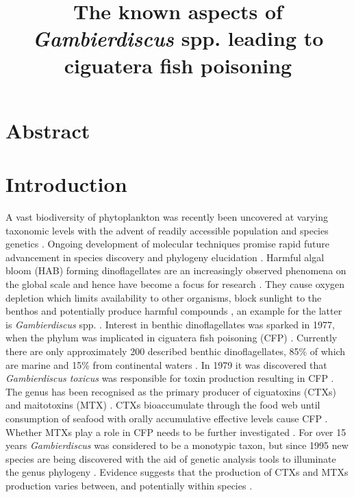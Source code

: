 \documentclass[12pt]{article}
\title{\textbf{The known aspects of \emph{Gambierdiscus} spp. leading to ciguatera fish poisoning}}
\date{}
\begin{document}
\maketitle
\tableofcontents
\section{Abstract}
\section{Introduction}




A vast biodiversity of phytoplankton was recently been uncovered at varying taxonomic levels with the advent of readily accessible population and species genetics \cite{simon2009diversity}. Ongoing development of molecular techniques promise rapid future advancement in species discovery and phylogeny elucidation \cite{murray2012genetic,murray2012transcriptomics}. 
Harmful algal bloom (HAB) forming dinoflagellates are an increasingly observed phenomena on the global scale and hence have become a focus for research \cite{berdalet2012global,hallegraeff2010ocean,garces2012habitat}. They cause oxygen depletion which limits availability to other organisms, block sunlight to the benthos and potentially produce harmful compounds \cite{grandjean2008centers}, an example for the latter is \emph{Gambierdiscus} spp. \cite{lehane2000ciguatera}.
Interest in benthic dinoflagellates was sparked in 1977, when the phylum was implicated in ciguatera fish poisoning (CFP) \cite{yasumoto1977finding}.  
Currently there are only approximately 200 described benthic dinoflagellates, 85\% of which are marine and 15\% from continental waters \cite{gomez2012quantitative}.
In 1979 it was discovered that \emph{Gambierdiscus toxicus} was responsible for toxin production resulting in CFP \cite{adachi1979thecal}. The genus has been recognised as the primary producer of ciguatoxins (CTXs) and maitotoxins (MTX) \cite{chinain1997intraspecific,holmes1998gambierdiscus}. CTXs bioaccumulate through the food web until consumption of seafood with orally accumulative effective levels cause CFP \cite{bagnis1979clinical,gillespie1987possible,sims1987theoretical}. Whether MTXs play a role in CFP needs to be further investigated \cite{kohli2014feeding}. For over 15 years \emph{Gambierdiscus} was considered to be a monotypic taxon, but since 1995 new species are being discovered with the aid of genetic analysis tools to illuminate the genus phylogeny \cite{faust1995observation,holmes1998gambierdiscus,litaker2009taxonomy,chinain1999morphology,fraga2011gambierdiscus,nishimura2014morphology}. Evidence suggests that the production of CTXs and MTXs production varies between, and potentially within species \cite{chinain2010growth,holland2013differences}. \\%
\end{document}
